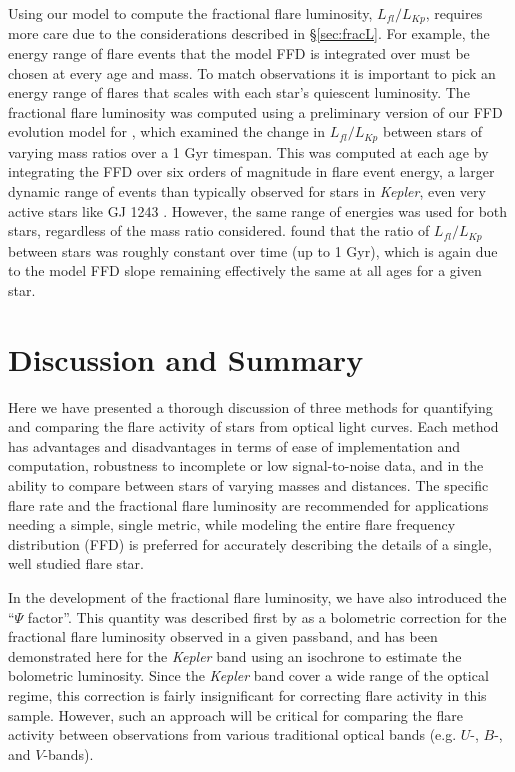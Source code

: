\documentclass[preprint2]{aastex62}
\newcommand{\Kepler}{\textsl{Kepler}\xspace}
\begin{document}
Using our model to compute the fractional flare luminosity, $L_{fl}/L_{Kp}$, requires more care due to the considerations described in \S\ref{sec:fracL}. For example, the energy range of flare events that the model FFD is integrated over must be chosen at every age and mass. To match observations it is important to pick an energy range of flares that scales with each star's quiescent luminosity. The fractional flare luminosity was computed using a preliminary version of our FFD evolution model for \citet{clarke2018}, which examined the change in $L_{fl}/L_{Kp}$ between stars of varying mass ratios over a 1 Gyr timespan. This was computed at each age by integrating the FFD over six orders of magnitude in flare event energy, a larger dynamic range of events than typically observed for stars in \Kepler, even very active stars like GJ 1243 \citep{hawley2014}. However, the same range of energies was used for both stars, regardless of the mass ratio considered. \citet{clarke2018} found that the ratio of $L_{fl}/L_{Kp}$ between stars was roughly constant over time (up to 1 Gyr), which is again due to the model FFD slope remaining effectively the same at all ages for a given star.



\section{Discussion and Summary}
\label{sec:discussion}

Here we have presented a thorough discussion of three methods for quantifying and comparing the flare activity of stars from optical light curves. Each method has advantages and disadvantages in terms of ease of implementation and computation, robustness to incomplete or low signal-to-noise data, and in the ability to compare between stars of varying masses and distances. The specific flare rate and the fractional flare luminosity are recommended for applications needing a simple, single metric, while modeling the entire flare frequency distribution (FFD) is preferred for accurately describing the details of a single, well studied flare star.

In the development of the fractional flare luminosity, we have also introduced the ``$\Psi$ factor''. This quantity was described first by \citet{lurie2015} as a bolometric correction for the fractional flare luminosity observed in a given passband, and has been demonstrated here for the \Kepler band using an isochrone to estimate the bolometric luminosity. Since the \Kepler band cover a wide range of the optical regime, this correction is fairly insignificant for correcting flare activity in this sample. However, such an approach will be critical for comparing the flare activity between observations from various traditional optical bands (e.g. $U$-, $B$-, and $V$-bands).
\end{document}
